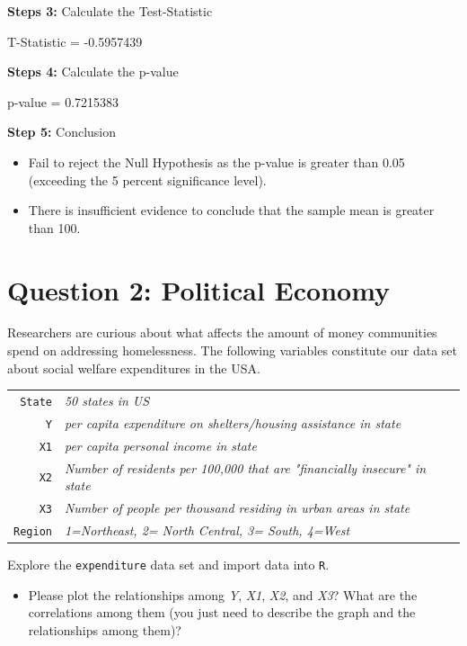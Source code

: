\documentclass[12pt,letterpaper]{article}
\begin{document}
\vspace{.5cm}
\noindent\textbf{Steps 3:} Calculate the Test-Statistic 

T-Statistic = -0.5957439

\vspace{.5cm}
\noindent\textbf{Steps 4:} Calculate the p-value 

p-value = 0.7215383

\vspace{.5cm}
\noindent\textbf{Step 5:} Conclusion  
\begin{itemize}
	\item 
Fail to reject the Null Hypothesis as the p-value is greater than 0.05 (exceeding the 5 percent significance level). 
\item 
There is insufficient evidence to conclude that the sample mean is greater than 100.
\end{itemize}

\newpage
	\section*{Question 2: Political Economy}

\noindent Researchers are curious about what affects the amount of money communities spend on addressing homelessness. The following variables constitute our data set about social welfare expenditures in the USA. \\

\begin{tabular}{r|l}
	\texttt{State} &\emph{50 states in US} \\
	\texttt{Y} & \emph{per capita expenditure on shelters/housing assistance in state}\\
	\texttt{X1} &\emph{per capita personal income in state} \\
	\texttt{X2} &  \emph{Number of residents per 100,000 that are "financially insecure" in state}\\
	\texttt{X3} &  \emph{Number of people per thousand residing in urban areas in state} \\
	\texttt{Region} &  \emph{1=Northeast, 2= North Central, 3= South, 4=West} \\
\end{tabular}

\vspace{.5cm}
\noindent Explore the \texttt{expenditure} data set and import data into \texttt{R}.
\vspace{.5cm}
  
\vspace{.5cm}
\begin{itemize}
\item
Please plot the relationships among \emph{Y}, \emph{X1}, \emph{X2}, and \emph{X3}? What are the correlations among them (you just need to describe the graph and the relationships among them)?
\vspace{.5cm}
\end{itemize}
\end{document}
